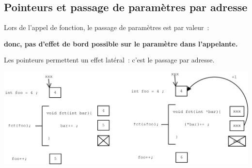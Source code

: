 \begin{frame}
    \section{Pointeurs et passage de param\`etres par adresse}
    Lors de l'appel de fonction, le passage de param\`etres est par valeur~: \\
    \begin{center}
      \textbf{donc, pas d'effet de bord possible sur le param\`etre dans l'appelante.}
    \end{center}
    \par\smallskip
 Les pointeurs permettent un effet lat\'eral~: c'est le passage par adresse.
    \begin{center}
      \includegraphics[scale=.22]{pointfunc}
    \end{center}
\end{frame}
